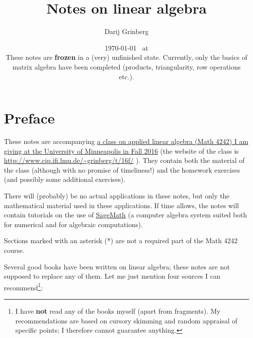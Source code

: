 \documentclass[numbers=enddot,12pt,final,onecolumn,notitlepage]{scrartcl}%
\theoremstyle{definition}
\begin{document}
\title{Notes on linear algebra}
\author{Darij Grinberg}
\date{
\today
\ at \currenttime\\
These notes are \textbf{frozen} in a (very) unfinished state. Currently, only
the basics of matrix algebra have been completed (products, triangularity, row
operations etc.).}
\maketitle
\tableofcontents

\section{Preface}

These notes are accompanying
\href{http://www.cip.ifi.lmu.de/~grinberg/t/16f/}{a class on applied linear
algebra (Math 4242) I am giving at the University of Minneapolis in Fall 2016}
(the website of the class is \url{http://www.cip.ifi.lmu.de/~grinberg/t/16f/}
). They contain both the material of the class (although with no promise of
timeliness!) and the homework exercises (and possibly some additional exercises).

There will (probably) be no actual applications in these notes, but only the
mathematical material used in these applications. If time allows, the notes
will contain tutorials on the use of \href{http://www.sagemath.org/}{SageMath}
(a computer algebra system suited both for numerical and for algebraic computations).

Sections marked with an asterisk (*) are not a required part of the Math 4242 course.

Several good books have been written on linear algebra; these notes are not
supposed to replace any of them. Let me just mention four sources I can
recommend\footnote{I have \textbf{not} read any of the books myself (apart
from fragments). My recommendations are based on cursory skimming and random
appraisal of specific points; I therefore cannot guarantee anything.}:
\end{document}
